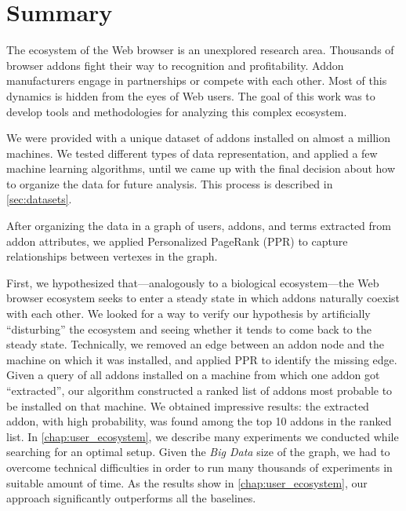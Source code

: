 \documentclass[ijoc,nonblindrev]{informs3} %
\numberwithin{equation}{subsection}
\begin{document}
\section{Summary}
\label{chap:summary}

The ecosystem of the Web browser is an unexplored research area. Thousands of browser addons fight their way to recognition and profitability. Addon manufacturers engage in partnerships or compete with each other. Most of this dynamics is hidden from the eyes of Web users. The goal of this work was to develop tools and methodologies for analyzing this complex ecosystem.

We were provided with a unique dataset of addons installed on almost a million machines. We tested different types of data representation, and applied a few machine learning algorithms, until we came up with the final decision about how to organize the data for future analysis. This process is described in \autoref{sec:datasets}.

After organizing the data in a graph of users, addons, and terms extracted from addon attributes, we applied Personalized PageRank (PPR) to capture relationships between vertexes in the graph.

First, we hypothesized that---analogously to a biological ecosystem---the Web browser ecosystem seeks to enter a steady state in which addons naturally coexist with each other. We looked for a way to verify our hypothesis by artificially ``disturbing'' the ecosystem and seeing whether it tends to come back to the steady state. Technically, we removed an edge between an addon node and the machine on which it was installed, and applied PPR to identify the missing edge. Given a query of all addons installed on a machine from which one addon got ``extracted'', our algorithm constructed a ranked list of addons most probable to be installed on that machine. We obtained impressive results: the extracted addon, with high probability, was found among the top 10 addons in the ranked list. In \autoref{chap:user_ecosystem}, we describe many experiments we conducted while searching for an optimal setup. Given the \emph{Big Data} size of the graph, we had to overcome technical difficulties in order to run many thousands of experiments in suitable amount of time. As the results show in \autoref{chap:user_ecosystem}, our approach significantly outperforms all the baselines.
\end{document}

